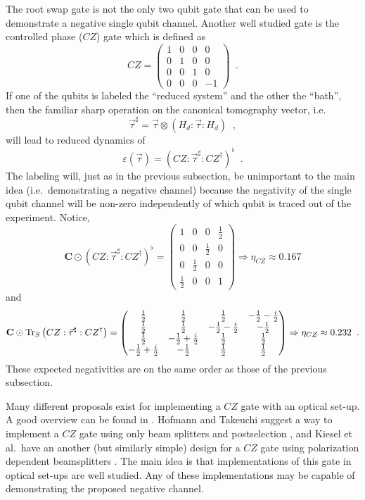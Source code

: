 The root swap gate is not the only two qubit gate that can be used to demonstrate a negative single qubit channel.  Another well studied gate is the controlled phase ($CZ$) gate which is defined as
$$
CZ = \begin{pmatrix}
1&0&0&0\\
0&1&0&0\\
0&0&1&0\\
0&0&0&-1
\end{pmatrix}\;\;.
$$
If one of the qubits is labeled the ``reduced system'' and the other the ``bath'', then the familiar sharp operation on the canonical tomography vector, i.e.\
$$
\vec{\tau}^\sharp = \vec{\tau} \otimes \left(H_d:\vec{\tau}:H_d\right)\;\;,
$$
will lead to reduced dynamics of
$$
\varepsilon(\vec{\tau}) = \left(CZ:\vec{\tau}^\sharp:CZ^\dagger\right)^\flat\;\;.
$$
The labeling will, just as in the previous subsection, be unimportant to the main idea (i.e.\ demonstrating a negative channel) because the negativity of the single qubit channel will be non-zero independently of which qubit is traced out of the experiment.  Notice,
\begin{equation}
\label{eqn:CZneg}
\mathbf{C}\odot \left(CZ:\vec{\tau}^\sharp:CZ^\dagger\right)^\flat = \begin{pmatrix}
 1 & 0 & 0 & \frac{1}{2} \\
 0 & 0 & \frac{1}{2} & 0 \\
 0 & \frac{1}{2} & 0 & 0 \\
 \frac{1}{2} & 0 & 0 & 1
\end{pmatrix}\Rightarrow\eta_{CZ} \approx 0.167 
\end{equation}
and
$$
\mathbf{C}\odot \operatorname{Tr}_S\left(CZ:\vec{\tau}^\sharp:CZ^\dagger\right) = \begin{pmatrix}
 \frac{1}{2} & \frac{1}{2} & \frac{1}{2} & -\frac{1}{2}-\frac{i}{2} \\
 \frac{1}{2} & \frac{1}{2} & -\frac{1}{2}-\frac{i}{2} & -\frac{1}{2} \\
 \frac{1}{2} & -\frac{1}{2}+\frac{i}{2} & \frac{1}{2} & \frac{1}{2} \\
 -\frac{1}{2}+\frac{i}{2} & -\frac{1}{2} & \frac{1}{2} & \frac{1}{2}
\end{pmatrix}\Rightarrow\eta_{CZ} \approx 0.232\;\;.
$$
These expected negativities are on the same order as those of the previous subsection.

Many different proposals exist for implementing a $CZ$ gate with an optical set-up.  A good overview can be found in \cite{Kieling2012}.  Hofmann and Takeuchi suggest a way to implement a $CZ$ gate using only beam splitters and postselection \cite{Hofmann2002}, and Kiesel et al.\ have an another (but similarly simple) design for a $CZ$ gate using polarization dependent beamsplitters \cite{Kiesel2005}.  The main idea is that implementations of this gate in optical set-ups are well studied.  Any of these implementations may be capable of demonstrating the proposed negative channel.  

